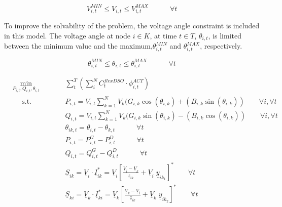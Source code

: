 \begin{equation*}
V_{i,t}^{MIN} \leq V_{i,t} \leq V_{i,t}^{MAX}  \quad   \qquad  \forall t 
\end{equation*}

To improve the solvability of the problem, the voltage angle constraint is included in this model. The voltage angle at node $i \in K$, at time $t \in T$, $\theta_{i,t}$, is limited between the minimum value and the maximum,$\theta_{i,t}^{MIN}$ and $\theta_{i,t}^{MAX}$, respectively.

\begin{equation*}
 \theta_{i,t}^{MIN} \leq \theta_{i,t}  \leq \theta_{i,t}^{MAX} \quad   \qquad  \forall t 
\end{equation*}


\begin{subequations}
\begin{alignat}{2}
&\!\min_{P_{i,t}, Q_{i,t}, \theta_{i,t}}  &\qquad& \sum_{t}^{T} \left( \sum_{i}^{N} C_t^{flexDSO} \cdot \phi_{i,t}^{ACT} \right) \label{eq:optProb}\\ 
&\phantom{Mi} \text{s.t.} &      & P_{i,t} = V_{i,t} \sum_{k=1}^{N} V_{k} (G_{i,k} \cos(\theta_{i,k}) + (B_{i,k} \sin(\theta_{i,k})) \qquad \forall i,\forall t \label{eq:activepowernodalbalance} \\ 
&				   &      & Q_{i,t} = V_{i,t} \sum_{k=1}^{N} V_{k} (G_{i,k} \sin(\theta_{i,k}) - (B_{i,k} \cos(\theta_{i,k})) \qquad \forall i,\forall t \label{eq:reactivepowernodalbalance} \\
&                  &      & \theta_{ik,t} = \theta_{i,t} - \theta_{k,t} \quad   \qquad  \forall t  \label{eq:voltageangle} \\
&                  &      & P_{i,t} = P_{i,t}^{G} - P_{i,t}^{D}  \quad   \qquad  \forall t  \label{eq:Pi} \\
&                  &      & Q_{i,t} = Q_{i,t}^{G} - Q_{i,t}^{D}  \quad   \qquad  \forall t  \label{eq:Qi} \\
&                  &      & \underline{S}_{ik} = \underline{V}_{i} \cdot \underline{I}_{ik}^{*} = \underline{V}_{i} \left[ \frac{\underline{V}_{i} - \underline{V}_{k}}{\underline{z}_{ik}} + \underline{V}_{i} \; \underline{y}_{ik_1} \right]^{*}   \qquad  \forall t  \label{eq:apparentflowlineik} \\
&                  &      & \underline{S}_{ki} = \underline{V}_{k} \cdot \underline{I}_{ki}^{*} = \underline{V}_{k} \left[ \frac{\underline{V}_{k} - \underline{V}_{i}}{\underline{z}_{ik}} + \underline{V}_{k} \;  \underline{y}_{ik_2} \right]^{*}   \qquad  \forall t  \label{eq:apparentflowlineki} \\

\end{alignat}
\end{subequations}
